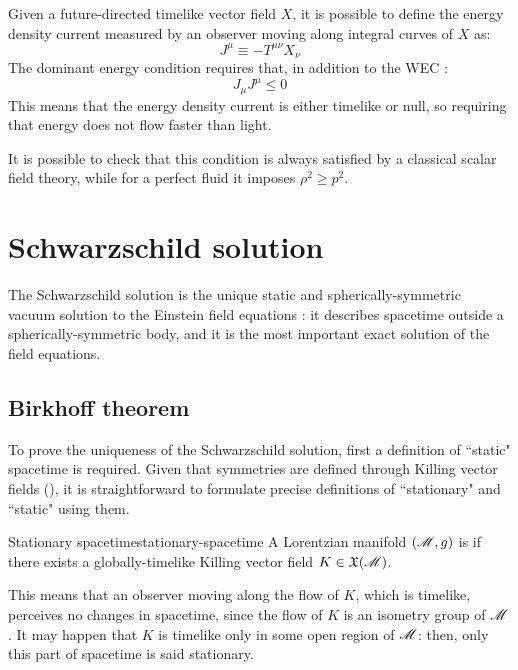 Given a future-directed timelike vector field $ X $, it is possible to define the energy density current measured by an observer moving along integral curves of $ X $ as:
\begin{equation*}
  J^\mu \equiv - T^{\mu \nu} X_\nu
\end{equation*}
The dominant energy condition requires that, in addition to the WEC :
\begin{equation}
  J_\mu J^\mu \le 0
  \label{eq:dominant-en-cond}
\end{equation}
This means that the energy density current is either timelike or null, so requiring that energy does not flow faster than light.

It is possible to check that this condition is always satisfied by a classical scalar field theory, while for a perfect fluid it imposes $ \rho^2 \ge p^2 $.

\newpage
\section{Schwarzschild solution}
\label{sec:schwarz-sol}

The Schwarzschild solution is the unique static and spherically-symmetric vacuum solution to the Einstein field equations : it describes spacetime outside a spherically-symmetric body, and it is the most important exact solution of the field equations.

\subsection{Birkhoff theorem}

To prove the uniqueness of the Schwarzschild solution, first a definition of ``static" spacetime is required. Given that symmetries are defined through Killing vector fields (), it is straightforward to formulate precise definitions of ``stationary" and ``static" using them.

\begin{definition}{Stationary spacetime}{stationary-spacetime}
  A Lorentzian manifold $ (\mathscr{M} , g) $ is  if there exists a globally-timelike Killing vector field $ K \in \mathfrak{X}(\mathscr{M}) $.
\end{definition}

This means that an observer moving along the flow of $ K $, which is timelike, perceives no changes in spacetime, since the flow of $ K $ is an isometry group of $ \mathscr{M} $. It may happen that $ K $ is timelike only in some open region of $ \mathscr{M} $: then, only this part of spacetime is said stationary.

